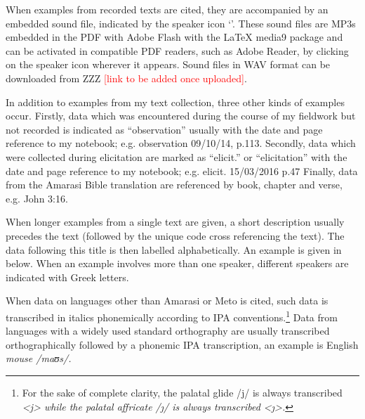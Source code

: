 When examples from recorded texts are cited,
they are accompanied by an embedded
sound file, indicated by the speaker icon `\spk{}'.
These sound files are MP3s embedded in the PDF with
Adobe Flash with the {\LaTeX} media9 package and can be activated
in compatible PDF readers, such as Adobe Reader,
by clicking on the speaker icon wherever it appears.
Sound files in WAV format can be downloaded from ZZZ
\textcolor{red}{[link to be added once uploaded]}.

In addition to examples from my text collection,
three other kinds of examples occur.
Firstly, data which was encountered during the course
of my fieldwork but not recorded is indicated as ``observation''
usually with the date and page reference to my notebook; e.g. {\ttfamily observation 09/10/14, p.113}.
Secondly, data which were collected during elicitation are marked as ``elicit.'' or ``elicitation''
with the date and page reference to my notebook; e.g. {\ttfamily elicit. 15/03/2016 p.47}
Finally, data from the Amarasi Bible translation are referenced
by book, chapter and verse, e.g. {\ttfamily John 3:16}.

When longer examples from a single text are given,
a short description usually precedes the text
(followed by the unique code cross referencing the text).
The data following this title is then labelled alphabetically.
An example is given in  below.
When an example involves more than one speaker,
different speakers are indicated with Greek letters.

\begin{exe}
	\label{ex:120715-4, 0.43-0.45 ch:Intr}
	\begin{xlist}
		\label{ex:120715-4, 0.43 ch:Intr}
		\label{ex:120715-4, 0.45 ch:Intr}
	\end{xlist}
\end{exe}

When data on languages other than Amarasi or Meto is cited,
such data is transcribed in italics phonemically according to IPA conventions.\footnote{
		For the sake of complete clarity, the palatal glide /j/
		is always transcribed \it{<j>} while the 
		palatal affricate /\j/ is always transcribed \it{<\j>}.}
Data from languages with a widely used standard
orthography are usually transcribed orthographically followed
by a phonemic IPA transcription, an example is English \it{mouse} /maʊs/.